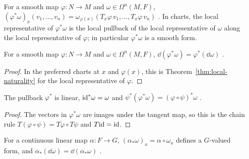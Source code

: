 \begin{definition}[Pullback]
  \label{def:diff-form-pullback}
  \leanok
  For a smooth map $\varphi \colon N \to M$ and $\omega \in \Omega^n(M, F)$,
  $(\varphi^*\omega)_x(v_1, \dots, v_n) = \omega_{\varphi(x)}(T_x\varphi\, v_1, \dots,
  T_x\varphi\, v_n)$ \cite[Definition~3.6.6]{GN26}. In charts, the local representative of
  $\varphi^*\omega$ is the local pullback of the local representative of $\omega$ along the local
  representative of $\varphi$; in particular $\varphi^*\omega$ is a smooth form.
\end{definition}

\begin{theorem}[Naturality of $\dd$]
  \label{thm:diff-form-naturality}
  \leanok
  For a smooth map $\varphi \colon N \to M$ and $\omega \in \Omega^n(M, F)$,
  $\dd(\varphi^*\omega) = \varphi^*(\dd\omega)$ \cite[Lemma~3.6.13]{GN26}.
\end{theorem}

\begin{proof}
  \leanok
  In the preferred charts at $x$ and $\varphi(x)$, this is Theorem~\ref{thm:local-naturality}
  for the local representative of $\varphi$.
\end{proof}

\begin{proposition}
  \label{prop:pullback-functorial}
  \leanok
  The pullback $\varphi^*$ is linear, $\mathrm{id}^*\omega = \omega$ and
  $\psi^*(\varphi^*\omega) = (\varphi \circ \psi)^*\omega$ \cite[(3.27)]{GN26}.
\end{proposition}

\begin{proof}
  \leanok
  The vectors in $\varphi^*\omega$ are images under the tangent map, so this is the chain rule
  $T(\varphi \circ \psi) = T\varphi \circ T\psi$ and $T\mathrm{id} = \mathrm{id}$.
\end{proof}

\begin{proposition}
  \label{prop:d-comp-clm}
  \leanok
  For a continuous linear map $\alpha \colon F \to G$, $(\alpha_*\omega)_x = \alpha \circ
  \omega_x$ defines a $G$-valued form, and $\alpha_*(\dd\omega) = \dd(\alpha_*\omega)$
  \cite[Exercise~3.6.4]{GN26}.
\end{proposition}

